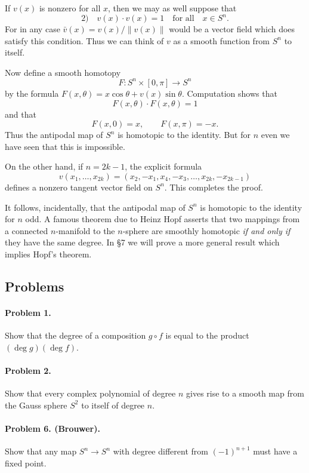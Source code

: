
If $v(x)$ is nonzero for all $x$, then we may as well suppose that
\[
\text{2)} \quad v(x) \cdot v(x) = 1 \quad \text{for all} \quad x \in S^n.
\]
For in any case $\bar{v}(x) = v(x) / \|v(x)\|$ would be a vector field which does satisfy this condition. Thus we can think of $v$ as a smooth function from $S^n$ to itself.

Now define a smooth homotopy
\[
F : S^n \times [0, \pi] \to S^n
\]
by the formula $F(x, \theta) = x \cos \theta + v(x) \sin \theta$. Computation shows that
\[
F(x, \theta) \cdot F(x, \theta) = 1
\]
and that
\[
F(x, 0) = x, \qquad F(x, \pi) = -x.
\]
Thus the antipodal map of $S^n$ is homotopic to the identity. But for $n$ even we have seen that this is impossible.

On the other hand, if $n = 2k - 1$, the explicit formula
\[
v(x_1, \ldots, x_{2k}) = (x_2, -x_1, x_4, -x_3, \ldots, x_{2k}, -x_{2k-1})
\]
defines a nonzero tangent vector field on $S^n$. This completes the proof.

It follows, incidentally, that the antipodal map of $S^n$ is homotopic to the identity for $n$ odd. A famous theorem due to Heinz Hopf asserts that two mappings from a connected $n$-manifold to the $n$-sphere are smoothly homotopic \emph{if and only if} they have the same degree. In §7 we will prove a more general result which implies Hopf's theorem.

\subsection*{Problems}

\paragraph{Problem 1.}
Show that the degree of a composition $g \circ f$ is equal to the product $(\deg g)(\deg f)$.

\paragraph{Problem 2.}
Show that every complex polynomial of degree $n$ gives rise to a smooth map from the Gauss sphere $S^2$ to itself of degree $n$.

\paragraph{Problem 6. (Brouwer).}
Show that any map $S^n \to S^n$ with degree different from $(-1)^{n+1}$ must have a fixed point.

